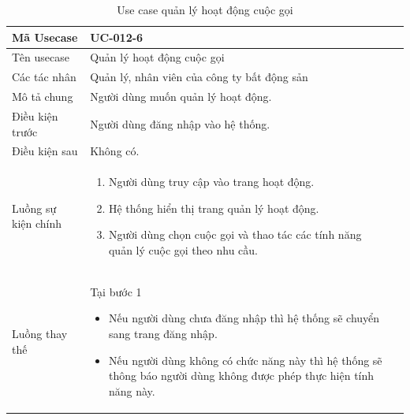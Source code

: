 \documentclass[12pt,a4paper]{article}
\begin{document}
    \begin{table}[H]
        \centering
        \begin{tabular}{|p{3.5cm}|p{11.5cm}|c|}
            \hline
            Mã Usecase      & UC-012-6                                    \\
            \hline
            Tên usecase     & Quản lý hoạt động cuộc gọi                  \\
            \hline
            Các tác nhân    & Quản lý, nhân viên của công ty bất động sản \\
            \hline
            Mô tả chung     & Người dùng muốn quản lý hoạt động.          \\
            \hline

            Điều kiện trước & Người dùng đăng nhập vào hệ thống.          \\
            \hline

            Điều kiện sau   & Không có.                                   \\
            \hline

            Luồng sự kiện chính & \vspace{-.8cm}\begin{enumerate}
                                                    \item Người dùng truy cập vào trang hoạt động.
                                                    \item Hệ thống hiển thị trang quản lý hoạt động.
                                                    \item Người dùng chọn cuộc gọi và thao tác các tính năng quản lý cuộc gọi theo nhu cầu.
            \end{enumerate}
            \\
            \hline
            Luồng thay thế & Tại bước 1\newline
            \vspace{-.8cm}\begin{itemize}
                              \item Nếu người dùng chưa đăng nhập thì hệ thống sẽ chuyển sang trang đăng nhập.
                              \item Nếu người dùng không có chức năng này thì hệ thống sẽ thông báo người dùng không được phép thực hiện tính năng này.
            \end{itemize}

            \\ \hline
        \end{tabular}
        \caption{Use case quản lý hoạt động cuộc gọi}

    \end{table}
\end{document}
